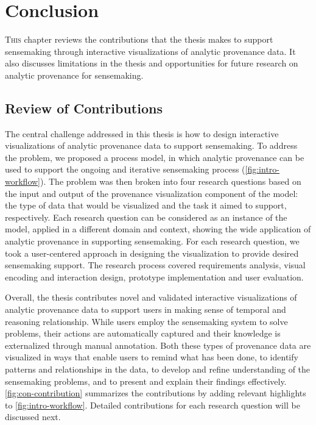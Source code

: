 \chapter{Conclusion}
\label{chap:conclusion}

\graphicspath{{Chapter7/figures/}}

\lettrine{T}{his} chapter reviews the contributions that the thesis makes to support sensemaking through interactive visualizations of analytic provenance data. It also discusses limitations in the thesis and opportunities for future research on analytic provenance for sensemaking.

\section{Review of Contributions}
The central challenge addressed in this thesis is how to design interactive visualizations of analytic provenance data to support sensemaking. To address the problem, we proposed a process model, in which analytic provenance can be used to support the ongoing and iterative sensemaking process (\autoref{fig:intro-workflow}). The problem was then broken into four research questions based on the input and output of the provenance visualization component of the model: the type of data that would be visualized and the task it aimed to support, respectively. Each research question can be considered as an instance of the model, applied in a different domain and context, showing the wide application of analytic provenance in supporting sensemaking. For each research question, we took a user-centered approach in designing the visualization to provide desired sensemaking support. The research process covered requirements analysis, visual encoding and interaction design, prototype implementation and user evaluation.

Overall, the thesis contributes novel and validated interactive visualizations of analytic provenance data to support users in making sense of temporal and reasoning relationship. While users employ the sensemaking system to solve problems, their actions are automatically captured and their knowledge is externalized through manual annotation. Both these types of provenance data are visualized in ways that enable users to remind what has been done, to identify patterns and relationships in the data, to develop and refine understanding of the sensemaking problems, and to present and explain their findings effectively. \autoref{fig:con-contribution} summarizes the contributions by adding relevant highlights to \autoref{fig:intro-workflow}. Detailed contributions for each research question will be discussed next.

